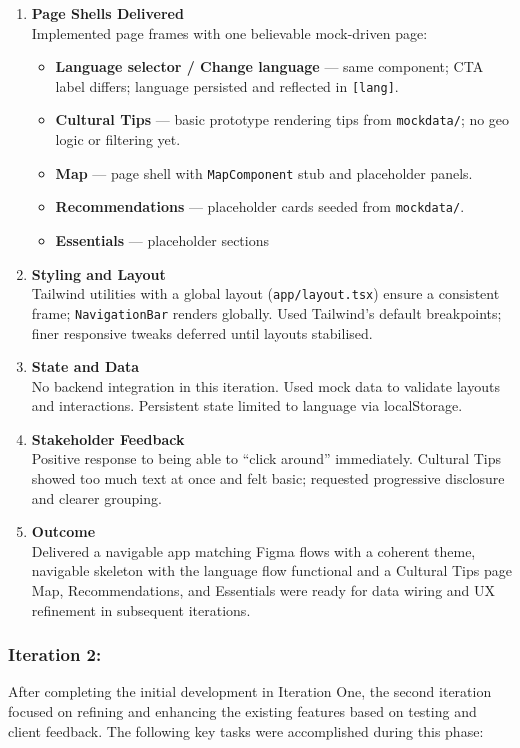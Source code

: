 \begin{enumerate}
    \item \textbf{Page Shells Delivered} \\
    Implemented page frames with one believable mock-driven page:
    \begin{itemize}
        \item \textbf{Language selector / Change language} — same component; CTA label differs; language persisted and reflected in \verb|[lang]|.
        \item \textbf{Cultural Tips} — basic prototype rendering tips from \texttt{mockdata/}; no geo logic or filtering yet.
        \item \textbf{Map} — page shell with \texttt{MapComponent} stub and placeholder panels.
        \item \textbf{Recommendations} — placeholder cards seeded from \texttt{mockdata/}.
        \item \textbf{Essentials} — placeholder sections 
    \end{itemize}

    \item \textbf{Styling and Layout} \\
    Tailwind utilities with a global layout (\verb|app/layout.tsx|) ensure a consistent frame; \texttt{NavigationBar} renders globally. Used Tailwind’s default breakpoints; finer responsive tweaks deferred until layouts stabilised.

    \item \textbf{State and Data} \\
    No backend integration in this iteration. Used mock data to validate layouts and interactions. Persistent state limited to language via localStorage.

    \item \textbf{Stakeholder Feedback} \\
    Positive response to being able to ``click around'' immediately. Cultural Tips showed too much text at once and felt basic; requested progressive disclosure and clearer grouping.

    \item \textbf{Outcome} \\
    Delivered a navigable app matching Figma flows with a coherent theme, navigable skeleton with the language flow functional and a Cultural Tips page Map, Recommendations, and Essentials were ready for data wiring and UX refinement in subsequent iterations.
\end{enumerate}

\subsubsection{Iteration 2:}
After completing the initial development in Iteration One, the second iteration focused on refining and enhancing the existing features based on testing and client feedback. The following key tasks were accomplished during this phase:

